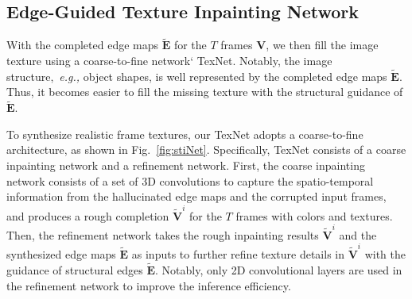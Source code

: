 \subsection{Edge-Guided Texture Inpainting Network}


With the completed edge maps $\boldsymbol{\widetilde{E}}$ for the $T$ frames $\boldsymbol{V}$, we then fill the image texture using a coarse-to-fine network` TexNet.
%
Notably, the image structure,~\emph{e.g.,} object shapes, is well represented by the completed edge maps $\boldsymbol{\widetilde{E}}$.
Thus, it becomes easier to fill the missing texture with the structural guidance of $\boldsymbol{\widetilde{E}}$.

To synthesize realistic frame textures, our TexNet adopts a coarse-to-fine architecture, as shown in Fig.~\ref{fig:stiNet}.
Specifically, TexNet consists of a coarse inpainting network and a refinement network.
%
First, the coarse inpainting network consists of a set of 3D convolutions to capture the spatio-temporal information from the hallucinated edge maps and the corrupted input frames, and produces a rough completion $\boldsymbol{\widetilde{V}}^i$ for the $T$ frames with colors and textures.
Then, the refinement network takes the rough inpainting results $\boldsymbol{\widetilde{V}}^i$ and the synthesized edge maps $\boldsymbol{\widetilde{E}}$ as inputs to further refine texture details in $\boldsymbol{\widetilde{V}}^i$ with the guidance of structural edges $\boldsymbol{\widetilde{E}}$.
Notably, only 2D convolutional layers are used in the refinement network to improve the inference efficiency. 

